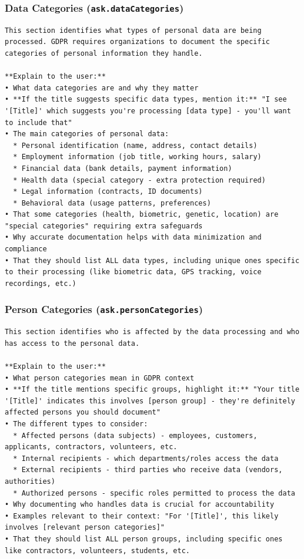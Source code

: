 \subsubsection*{Data Categories (\texttt{ask.dataCategories})}

\begin{lstlisting}
This section identifies what types of personal data are being processed. GDPR requires organizations to document the specific categories of personal information they handle.

**Explain to the user:**
• What data categories are and why they matter
• **If the title suggests specific data types, mention it:** "I see '[Title]' which suggests you're processing [data type] - you'll want to include that"
• The main categories of personal data:
  * Personal identification (name, address, contact details)
  * Employment information (job title, working hours, salary)
  * Financial data (bank details, payment information)
  * Health data (special category - extra protection required)
  * Legal information (contracts, ID documents)
  * Behavioral data (usage patterns, preferences)
• That some categories (health, biometric, genetic, location) are "special categories" requiring extra safeguards
• Why accurate documentation helps with data minimization and compliance
• That they should list ALL data types, including unique ones specific to their processing (like biometric data, GPS tracking, voice recordings, etc.)
\end{lstlisting}

\subsubsection*{Person Categories (\texttt{ask.personCategories})}

\begin{lstlisting}
This section identifies who is affected by the data processing and who has access to the personal data.

**Explain to the user:**
• What person categories mean in GDPR context
• **If the title mentions specific groups, highlight it:** "Your title '[Title]' indicates this involves [person group] - they're definitely affected persons you should document"
• The different types to consider:
  * Affected persons (data subjects) - employees, customers, applicants, contractors, volunteers, etc.
  * Internal recipients - which departments/roles access the data
  * External recipients - third parties who receive data (vendors, authorities)
  * Authorized persons - specific roles permitted to process the data
• Why documenting who handles data is crucial for accountability
• Examples relevant to their context: "For '[Title]', this likely involves [relevant person categories]"
• That they should list ALL person groups, including specific ones like contractors, volunteers, students, etc.
\end{lstlisting}

